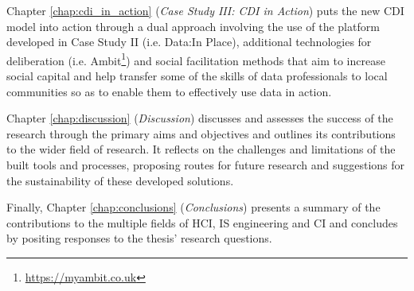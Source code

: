 \begin{introduction}
\noindent
Chapter \ref{chap:cdi_in_action} (\textit{Case Study III: CDI in Action}) puts the new CDI model into action through a dual approach involving the use of the platform developed in Case Study II (i.e. Data:In Place), additional technologies for deliberation (i.e. Ambit\footnote{\url{https://myambit.co.uk}}) and social facilitation methods that aim to increase social capital and help transfer some of the skills of data professionals to local communities so as to enable them to effectively use data in action.
\newline

\noindent
Chapter \ref{chap:discussion} (\textit{Discussion}) discusses and assesses the success of the research through the primary aims and objectives and outlines its contributions to the wider field of research. It reflects on the challenges and limitations of the built tools and processes, proposing routes for future research and suggestions for the sustainability of these developed solutions.
\newline

\noindent
Finally, Chapter \ref{chap:conclusions} (\textit{Conclusions}) presents a summary of the contributions to the multiple fields of HCI, IS engineering and CI and concludes by positing responses to the thesis' research questions.
\end{introduction}
\clearpage